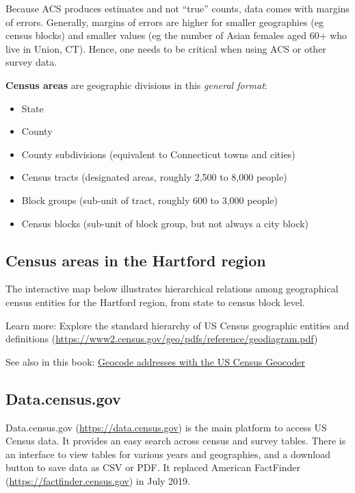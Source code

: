 \documentclass[
  english,
]{book}
\providecommand{\tightlist}{%
  \setlength{\itemsep}{0pt}\setlength{\parskip}{0pt}}
\begin{document}
Because ACS produces estimates and not ``true'' counts, data comes with margins of errors. Generally, margins of errors are higher for smaller geographies (eg census blocks) and smaller values (eg the number of Asian females aged 60+ who live in Union, CT). Hence, one needs to be critical when using ACS or other survey data.

\textbf{Census areas} are geographic divisions in this \emph{general format}:

\begin{itemize}
\tightlist
\item
  State
\item
  County
\item
  County subdivisions (equivalent to Connecticut towns and cities)
\item
  Census tracts (designated areas, roughly 2,500 to 8,000 people)
\item
  Block groups (sub-unit of tract, roughly 600 to 3,000 people)
\item
  Census blocks (sub-unit of block group, but not always a city block)
\end{itemize}

\hypertarget{census-areas-in-the-hartford-region}{%
\subsection{Census areas in the Hartford region}\label{census-areas-in-the-hartford-region}}

The interactive map below illustrates hierarchical relations among geographical census entities for the Hartford region, from state to census block level.

Learn more: Explore the standard hierarchy of US Census geographic entities and definitions (\url{https://www2.census.gov/geo/pdfs/reference/geodiagram.pdf})

See also in this book: \href{geocode}{Geocode addresses with the US Census Geocoder}

\hypertarget{data.census.gov}{%
\subsection{Data.census.gov}\label{data.census.gov}}

Data.census.gov (\url{https://data.census.gov}) is the main platform to access US Census data. It provides an easy search across census and survey tables. There is an interface to view tables for various years and geographies, and a download button to save data as CSV or PDF. It replaced American FactFinder (\url{https://factfinder.census.gov}) in July 2019.
\end{document}

